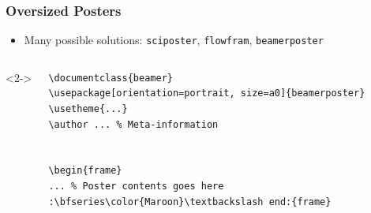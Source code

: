 \begin{frame}[fragile]
\frametitle{Oversized Posters}
\begin{itemize}
\item Many possible solutions: \texttt{sciposter}, \texttt{flowfram}, \alert<2->{\texttt{beamerposter}}
\end{itemize}

\begin{columns}<2->
\begin{column}{.5\textwidth}
\begin{beamerboxesrounded}[width=\linewidth]{}
\begin{lstlisting}[basicstyle=\ttfamily\small,
moretexcs={usetheme,frametitle,frame},
emph={beamer,beamerposter,frame},
escapechar={:},lineskip=-2pt]
\documentclass{beamer}
\usepackage[orientation=portrait, size=a0]{beamerposter}
\usetheme{...}
\author ... % Meta-information


\begin{frame}
... % Poster contents goes here
:\bfseries\color{Maroon}\textbackslash end:{frame}


\end{lstlisting}
\end{beamerboxesrounded}
\end{column}
\end{columns}
\end{frame}
